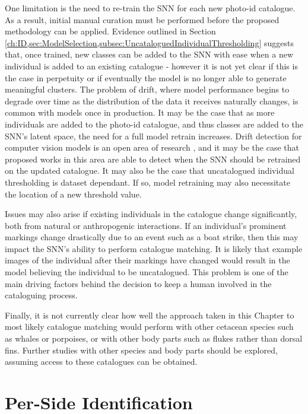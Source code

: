 One limitation is the need to re-train the SNN for each new photo-id catalogue. As a result, initial manual curation must be performed before the proposed methodology can be applied. Evidence outlined in Section \ref{ch:ID,sec:ModelSelection,subsec:UncataloguedIndividualThresholding} suggests that, once trained, new classes can be added to the SNN with ease when a new individual is added to an existing catalogue - however it is not yet clear if this is the case in perpetuity or if eventually the model is no longer able to generate meaningful clusters. The problem of drift, where model performance begins to degrade over time as the distribution of the data it receives naturally changes, is common with models once in production. It may be the case that as more individuals are added to the photo-id catalogue, and thus classes are added to the SNN's latent space, the need for a full model retrain increases. Drift detection for computer vision models is an open area of research \cite{siva_weakly_2011, suprem_odin_2020, nagar_concept_2020, cobb_context-aware_2022}, and it may be the case that proposed works in this area are able to detect when the SNN should be retrained on the updated catalogue. It may also be the case that uncatalogued individual thresholding is dataset dependant. If so, model retraining may also necessitate the location of a new threshold value. 

Issues may also arise if existing individuals in the catalogue change significantly, both from natural or anthropogenic interactions. If an individual's prominent markings change drastically due to an event such as a boat strike, then this may impact the SNN's ability to perform catalogue matching. It is likely that example images of the individual after their markings have changed would result in the model believing the individual to be uncatalogued. This problem is one of the main driving factors behind the decision to keep a human involved in the cataloguing process.

Finally, it is not currently clear how well the approach taken in this Chapter to most likely catalogue matching would perform with other cetacean species such as whales or porpoises, or with other body parts such as flukes rather than dorsal fins. Further studies with other species and body parts should be explored, assuming access to these catalogues can be obtained. 

\section{Per-Side Identification}\label{ch:ID,sec:perSide}

